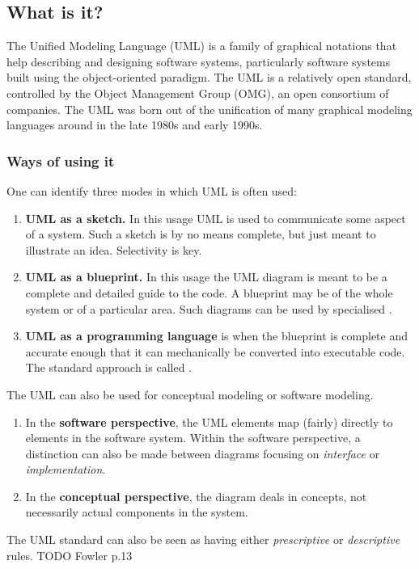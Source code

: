 \subsection{What is it?}
The Unified Modeling Language (UML) is a family of graphical notations that help describing and designing software systems, particularly software systems built using the object-oriented paradigm. The UML is a relatively open standard, controlled by the Object Management Group (OMG), an open consortium of companies. The UML was born out of the unification of many graphical modeling languages around in the late 1980s and early 1990s.

\subsubsection{Ways of using it}
One can identify three modes in which UML is often used:
\begin{enumerate}
\item \textbf{UML as a sketch.} In this usage UML is used to communicate some aspect of a system. Such a sketch is by no means complete, but just meant to illustrate an idea. Selectivity is key.
\item \textbf{UML as a blueprint.} In this usage the UML diagram is meant to be a complete and detailed guide to the code. A blueprint may be of the whole system or of a particular area. Such diagrams can be used by specialised .
\item \textbf{UML as a programming language} is when the blueprint is complete and accurate enough that it can mechanically be converted into executable code. The standard approach is called . 
\end{enumerate}

The UML can also be used for conceptual modeling or software modeling.
\begin{enumerate}
\item In the \textbf{software perspective}, the UML elements map (fairly) directly to elements in the software system. Within the software perspective, a distinction can also be made between diagrams focusing on \textit{interface} or \textit{implementation}.
\item In the \textbf{conceptual perspective}, the diagram deals in concepts, not necessarily actual components in the system.
\end{enumerate}

The UML standard can also be seen as having either \textit{prescriptive} or \textit{descriptive} rules. TODO Fowler p.13

